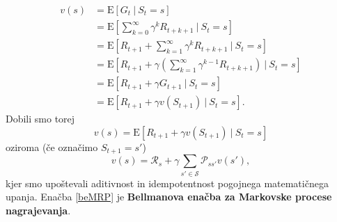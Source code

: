 \documentclass[12pt,a4paper]{amsart}
\theoremstyle{definition} %
\theoremstyle{plain} %
\begin{document}
\begin{align*}
    v(s) &= \mathrm{E} [G_t~|~S_t = s] \\
         &= \mathrm{E} [\sum_{k=0}^\infty \gamma^k R_{t + k + 1}~|~S_t = s] \\
         &= \mathrm{E} [R_{t+1} + \sum_{k=1}^\infty \gamma^k R_{t + k + 1}~|~S_t = s] \\
         &= \mathrm{E} [R_{t+1} + \gamma(\sum_{k=1}^\infty \gamma^{k-1} R_{t + k + 1})~|~S_t = s] \\
         &= \mathrm{E} [R_{t+1} + \gamma G_{t+1}~|~S_t = s] \\
         &= \mathrm{E} [R_{t+1} + \gamma v(S_{t+1})~|~S_t = s].
\end{align*}
Dobili smo torej 
$$
v(s) = \mathrm{E} [R_{t+1} + \gamma v(S_{t+1})~|~S_t = s]
$$
oziroma (če označimo $S_{t+1} = s'$)
\begin{equation}\label{beMRP}
    v(s) = \mathcal{R}_s + \gamma \sum_{s' \in \mathcal{S}} \mathcal{P}_{ss'} v(s'),
\end{equation} 
kjer smo upoštevali aditivnost in idempotentnost pogojnega matematičnega upanja. Enačba \eqref{beMRP}
je \textbf{Bellmanova enačba za Markovske procese nagrajevanja}.
\end{document}
